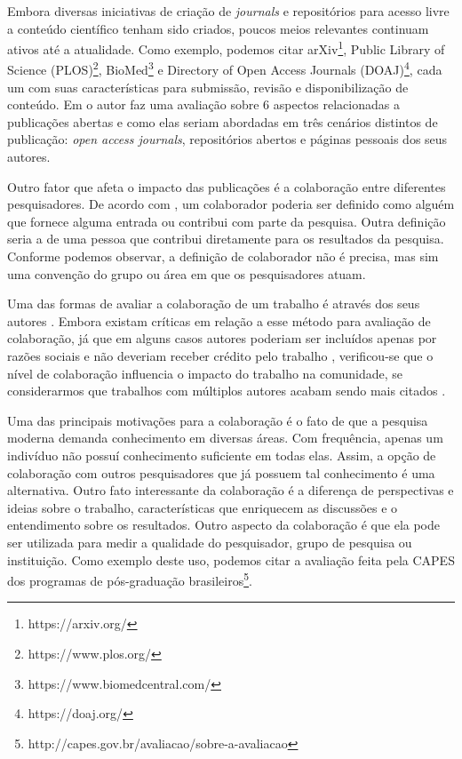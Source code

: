 Embora diversas iniciativas de criação de \textit{journals} e repositórios para acesso livre a conteúdo científico tenham sido criados, poucos meios relevantes continuam ativos até a atualidade. Como exemplo, podemos citar arXiv\footnote{https://arxiv.org/}, Public Library of Science (PLOS)\footnote{https://www.plos.org/}, BioMed\footnote{https://www.biomedcentral.com/} e Directory of Open Access Journals (DOAJ)\footnote{https://doaj.org/}, cada um com suas características para submissão, revisão e disponibilização de conteúdo. Em \cite{OpenAccessAnalysis2004} o autor faz uma avaliação sobre 6 aspectos relacionadas a publicações abertas e como elas seriam abordadas em três cenários distintos de publicação: \textit{open access journals}, repositórios abertos e páginas pessoais dos seus autores.

Outro fator que afeta o impacto das publicações é a colaboração entre diferentes pesquisadores. De acordo com \cite{ResearchCollaboration1997}, um colaborador poderia ser definido como alguém que fornece alguma entrada ou contribui com parte da pesquisa. Outra definição seria a de uma pessoa que contribui diretamente para os resultados da pesquisa. Conforme podemos observar, a definição de colaborador não é precisa, mas sim uma convenção do grupo ou área em que os pesquisadores atuam.

Uma das formas de avaliar a colaboração de um trabalho é através dos seus autores \cite{Bibliographical1971}. Embora existam críticas em relação a esse método para avaliação de colaboração, já que em alguns casos autores poderiam ser incluídos apenas por razões sociais e não deveriam receber crédito pelo trabalho \cite{Stealing1993}, verificou-se que o nível de colaboração influencia o impacto do trabalho na comunidade, se considerarmos que trabalhos com múltiplos autores acabam sendo mais citados \cite{Bibliometrics1986}.

Uma das principais motivações para a colaboração é o fato de que a pesquisa moderna demanda conhecimento em diversas áreas. Com frequência, apenas um indivíduo não possuí conhecimento suficiente em todas elas. Assim, a opção de colaboração com outros pesquisadores que já possuem tal conhecimento é uma alternativa. Outro fato interessante da colaboração é a diferença de perspectivas e ideias sobre o trabalho, características que enriquecem as discussões e o entendimento sobre os resultados. Outro aspecto da colaboração é que ela pode ser utilizada para medir a qualidade do pesquisador, grupo de pesquisa ou instituição. Como exemplo deste uso, podemos citar a avaliação feita pela CAPES dos programas de pós-graduação brasileiros\footnote{http://capes.gov.br/avaliacao/sobre-a-avaliacao}.

